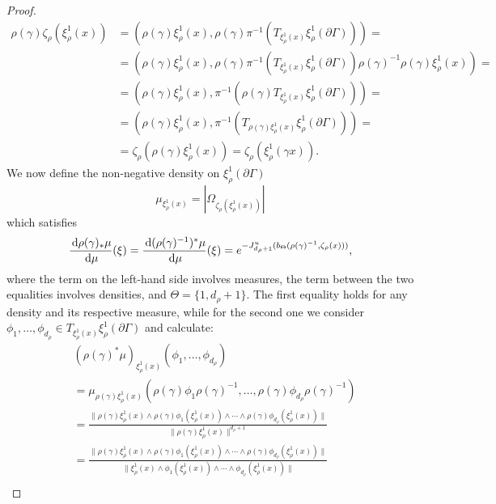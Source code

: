 \documentclass{report}
\begin{document}
\begin{proof}
    \begin{align*}
        \rho(\gamma) \zeta_\rho(\xi_\rho^1(x)) &=
         \left( \rho(\gamma) \xi_\rho^1(x), 
            \rho(\gamma) \pi^{-1}(T_{\xi_\rho^1(x)} \xi_\rho^1(\partial \Gamma)) \right) =\\
        &= \left( \rho(\gamma) \xi_\rho^1(x), 
        \rho(\gamma) \pi^{-1}(T_{\xi_\rho^1(x)} \xi_\rho^1(\partial \Gamma)) \rho(\gamma)^{-1} \rho(\gamma) \xi_\rho^1(x) \right) =\\
        &= \left( \rho(\gamma) \xi_\rho^1(x), 
           \pi^{-1}(\rho(\gamma) T_{\xi_\rho^1(x)} \xi_\rho^1(\partial \Gamma)) \right) =\\
        &= \left( \rho(\gamma) \xi_\rho^1(x), 
        \pi^{-1}(T_{\rho(\gamma) \xi_\rho^1(x)} \xi_\rho^1(\partial \Gamma)) \right) =\\
        &= \zeta_\rho(\rho(\gamma) \xi_\rho^1(x)) = 
        \zeta_\rho( \xi_\rho^1(\gamma x)).
    \end{align*}
    We now define the non-negative density on $\xi_\rho^1(\partial \Gamma)$
    \[
        \mu_{\xi_\rho^1(x)} = |\Omega_{\zeta_\rho(\xi_\rho^1(x))}|
    \]
    which satisfies
    \[
        \frac{\,\mathrm{d} \rho(\gamma)_*\mu}{\,\mathrm{d}\mu}(\xi) = \frac{\,\mathrm{d} (\rho(\gamma)^{-1})^*\mu}{\,\mathrm{d}\mu}(\xi) =
        e^{-J^u_{d_\rho + 1}(b_\Theta(\rho(\gamma)^{-1}, \zeta_\rho(x)))},
    \]
    where the term on the left-hand side involves measures, the term between the two equalities involves densities, and $\Theta = \{1, d_\rho + 1\}$.
    The first equality holds for any density and its respective measure, while for the second one we consider $\phi_1, \ldots, \phi_{d_\rho} \in T_{\xi_\rho^1(x)}\xi_\rho^1(\partial \Gamma)$ and calculate:
    \begin{align*}
        &(\rho(\gamma)^*\mu)_{\xi_\rho^1(x)} (\phi_1, \ldots, \phi_{d_\rho})\\
        &=
        \mu_{\rho(\gamma)\xi_\rho^1(x)} (\rho(\gamma)\phi_1\rho(\gamma)^{-1}, \ldots, \rho(\gamma)\phi_{d_\rho} \rho(\gamma)^{-1}) \\
        &=
        \frac{\|\rho(\gamma) \xi_\rho^1(x) \wedge \rho(\gamma) \phi_1(\xi_\rho^1(x)) \wedge \cdots \wedge \rho(\gamma) \phi_{d_\rho}(\xi_\rho^1(x))\|}
        {\| \rho(\gamma) \xi_\rho^1(x) \|^{d_\rho + 1}} \\
        &=
        \frac{\|\rho(\gamma) \xi_\rho^1(x) \wedge \rho(\gamma) \phi_1(\xi_\rho^1(x)) \wedge \cdots \wedge \rho(\gamma) \phi_{d_\rho}(\xi_\rho^1(x))\|}
        {\|\xi_\rho^1(x) \wedge \phi_1(\xi_\rho^1(x)) \wedge \cdots \wedge \phi_{d_\rho}(\xi_\rho^1(x))\|} \\

\end{align*}
\end{proof}
\end{document}
